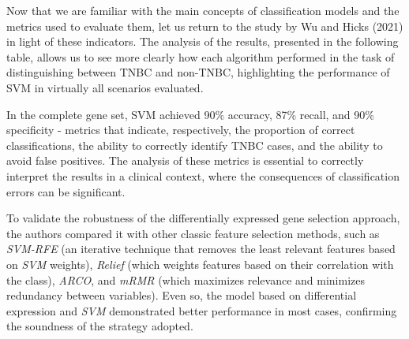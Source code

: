 Now that we are familiar with the main concepts of classification models and
the metrics used to evaluate them, let us return to the study by Wu and Hicks
(2021) in light of these indicators. The analysis of the results, presented in
the following table, allows us to see more clearly how each algorithm performed
in the task of distinguishing between TNBC and non-TNBC, highlighting the
performance of SVM in virtually all scenarios evaluated.


In the complete gene set, SVM achieved 90\% accuracy, 87\% recall, and 90\%
specificity - metrics that indicate, respectively, the proportion of correct
classifications, the ability to correctly identify TNBC cases, and the ability
to avoid false positives. The analysis of these metrics is essential to
correctly interpret the results in a clinical context, where the consequences
of classification errors can be significant.

To validate the robustness of the differentially expressed gene selection
approach, the authors compared it with other classic feature selection methods,
such as \textit{SVM-RFE} (an iterative technique that removes the least
relevant features based on \textit{SVM} weights), \textit{Relief} (which
weights features based on their correlation with the class), \textit{ARCO}, and
\textit{mRMR} (which maximizes relevance and minimizes redundancy between
variables). Even so, the model based on differential expression and
\textit{SVM} demonstrated better performance in most cases, confirming the
soundness of the strategy adopted.

